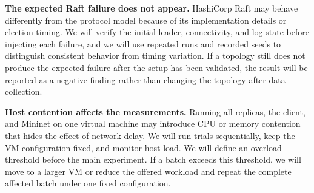 \documentclass[11pt,a4paper]{article}
\begin{document}
\textbf{The expected Raft failure does not appear.}
HashiCorp Raft may behave differently from the protocol model because of its implementation details or election timing. We will verify the initial leader, connectivity, and log state before injecting each failure, and we will use repeated runs and recorded seeds to distinguish consistent behavior from timing variation. If a topology still does not produce the expected failure after the setup has been validated, the result will be reported as a negative finding rather than changing the topology after data collection.

\textbf{Host contention affects the measurements.}
Running all replicas, the client, and Mininet on one virtual machine may introduce CPU or memory contention that hides the effect of network delay. We will run trials sequentially, keep the VM configuration fixed, and monitor host load. We will define an overload threshold before the main experiment. If a batch exceeds this threshold, we will move to a larger VM or reduce the offered workload and repeat the complete affected batch under one fixed configuration.



\end{document}
